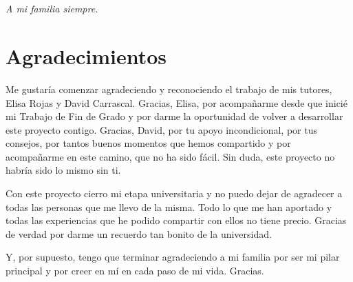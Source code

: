 

\cleardoublepage %
\chapter*{}
\setlength{\leftmargin}{0.5\textwidth}
\setlength{\parsep}{0cm}
\addtolength{\topsep}{0.5cm}
\begin{flushright}
	\small\em{
		A mi familia siempre.
	}
\end{flushright}

 


\chapter*{Agradecimientos}

\thispagestyle{empty}
\vspace{1cm}

Me gustaría comenzar agradeciendo y reconociendo el trabajo de mis tutores, Elisa Rojas y David Carrascal. Gracias, Elisa, por acompañarme desde que inicié mi Trabajo de Fin de Grado y por darme la oportunidad de volver a desarrollar este proyecto contigo. Gracias, David, por tu apoyo incondicional, por tus consejos, por tantos buenos momentos que hemos compartido y por acompañarme en este camino, que no ha sido fácil. Sin duda, este proyecto no habría sido lo mismo sin ti. 

\vspace{3mm}

Con este proyecto cierro mi etapa universitaria y no puedo dejar de agradecer a todas las personas que me llevo de la misma. Todo lo que me han aportado y todas las experiencias que he podido compartir con ellos no tiene precio. Gracias de verdad por darme un recuerdo tan bonito de la universidad.

\vspace{3mm}

Y, por supuesto, tengo que terminar agradeciendo a mi familia por ser mi pilar principal y por creer en mí en cada paso de mi vida. Gracias.

\cleardoublepage %



